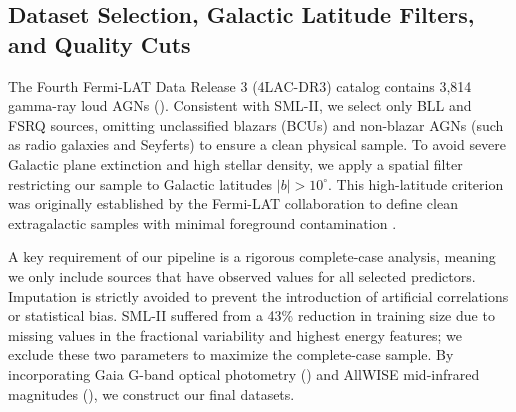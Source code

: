 \documentclass[twocolumn,linenumbers,floatfix]{aastex701}
\begin{document}
\subsection{Dataset Selection, Galactic Latitude Filters, and Quality Cuts}
The Fourth Fermi-LAT Data Release 3 (4LAC-DR3) catalog contains 3,814 gamma-ray loud AGNs (\citealt{Abdollahi2020, Ajello2020}). Consistent with SML-II, we select only BLL and FSRQ sources, omitting unclassified blazars (BCUs) and non-blazar AGNs (such as radio galaxies and Seyferts) to ensure a clean physical sample. To avoid severe Galactic plane extinction and high stellar density, we apply a spatial filter restricting our sample to Galactic latitudes $|b| > 10^\circ$. This high-latitude criterion was originally established by the Fermi-LAT collaboration to define clean extragalactic samples with minimal foreground contamination \citep{Abdo2010}.

A key requirement of our pipeline is a rigorous complete-case analysis, meaning we only include sources that have observed values for all selected predictors. Imputation is strictly avoided to prevent the introduction of artificial correlations or statistical bias. SML-II suffered from a 43\% reduction in training size due to missing values in the fractional variability and highest energy features; we exclude these two parameters to maximize the complete-case sample. By incorporating Gaia G-band optical photometry (\citealt{Gaia2023}) and AllWISE mid-infrared magnitudes (\citealt{Wright2010}), we construct our final datasets. 
\end{document}
